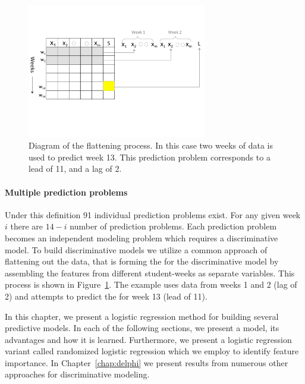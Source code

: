 \begin{figure}[ht!]
  \caption{Diagram of the flattening process. In this case two weeks of data is used to predict week 13. This prediction problem corresponds to a lead of 11, and a lag of 2.}\label{fig:flattening}
  \centering
    \includegraphics[width=0.7\textwidth]{figures/Flattening}
\end{figure}

\paragraph{Multiple prediction problems}\label{para:multiple_prediction}
Under this definition 91 individual prediction problems exist. For any given week $i$ there are $14-i$ number of prediction problems. Each prediction problem becomes an independent modeling problem which requires a discriminative model. To build discriminative models we utilize a common approach of flattening out the data, that is forming the \cov for the discriminative model by assembling the features from different student-weeks as separate variables. This process is shown in Figure~\ref{fig:flattening}. The example uses data from weeks 1 and 2 (lag of 2) and attempts to predict the \sti for week 13 (lead of 11). 

In this chapter, we present a logistic regression method for building several predictive models. In each of the following sections, we present a model, its advantages and how it is learned. Furthermore, we present a logistic regression variant called randomized logistic regression which we employ to identify feature importance. In Chapter~\ref{chap:delphi} we present results from numerous other approaches for discriminative modeling. 

